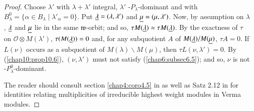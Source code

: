 \begin{proof}
 Choose $\lambda'$ with $\lambda + \lambda'$ integral, $\lambda'$
 -$P_\lambda$-dominant and with $B^0_\lambda = \{\alpha \in B_\lambda
 \mid \lambda'_\alpha = 0\}$. Put $\underline{\lambda} = (\lambda, \lambda')$
 and $\underline{\mu} = (\mu, \lambda' )$. Now, by assumption on $\lambda$,
 $\underline{\lambda}$ and $\underline{\mu}$  lie in the same $\mathfrak{w}$-orbit;
 and so, $\tau M (\underline{\lambda}) \simeq \tau M (\underline{\lambda})$. By the
 exactness of $\tau$ on $\mathscr{O} \otimes M(\lambda')$, $\tau
 (M(\underline{\lambda})) = 0$ and, for any subquotient $A$ of\pageoriginale
 $M(\underline{\lambda}) / M(\underline{\mu})$, $\tau A = 0$. If $L(\nu)$ occurs as a
 subquotient of $M(\lambda) \backslash M(\mu)$, then $\tau L(\nu, \lambda')
 =0$. By (\ref{chap10:prop10.6}), $(\nu, \lambda')$ must not satisfy
 (\ref{chap6:subsec6.5}); and so, 
 $\nu$ is not -$P^0_\lambda$-dominant. 

The reader should consult section \ref{chap4:coro4.5} in \cite{key3} as well as Satz
2.12 in \cite{key24} for identities relating multiplicities of
irreducible highest weight modules in Verma modules. 
\end{proof}
